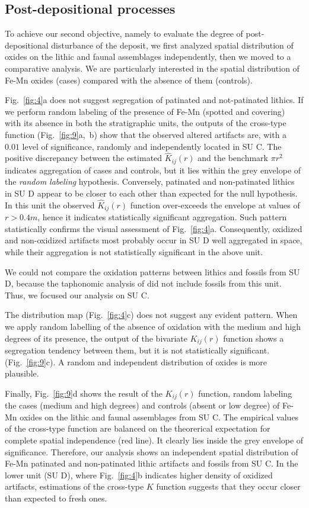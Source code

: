 \documentclass[5p,authoryear]{elsarticle} %
\begin{document}
\subsection{Post-depositional processes}

To achieve our second objective, namely to evaluate the degree of post-depositional disturbance of the deposit, we first analyzed spatial distribution of oxides on the lithic and faunal assemblages independently, then we moved to a comparative analysis. We are particularly interested in the spatial distribution of Fe-Mn oxides (cases) compared with the absence of them (controls).

Fig.~\ref{fig:4}a does not suggest segregation of patinated and not-patinated lithics. If we perform random labeling of the presence of Fe-Mn (spotted and covering) with its absence in both the stratigraphic units, the outputs of the cross-type function (Fig.~\ref{fig:9}a,~b) show that the observed altered artifacts are, with a $0.01$ level of significance, randomly and independently located in SU C. The positive discrepancy between the estimated $\hat K_{ij}(r)$ and the benchmark $\pi r^2$ indicates aggregation of cases and controls, but it lies within the grey envelope of the \emph{random labeling} hypothesis. Conversely, patinated and non-patinated lithics in SU D appear to be closer to each other than expected for the null hypothesis. In this unit the observed $\hat K_{ij}(r)$ function over-exceeds the envelope at values of $r>0.4 m$, hence it indicates statistically significant aggregation. Such pattern statistically confirms the visual assessment of Fig.~\ref{fig:4}a. Consequently, oxidized and non-oxidized artifacts most probably occur in SU D well aggregated in space, while their aggregation is not statistically significant in the above unit.

We could not compare the oxidation patterns between lithics and fossils from SU D, because the taphonomic analysis of \citet{Bagnus2011} did not include fossils from this unit. Thus, we focused our analysis on SU C.

The distribution map (Fig.~\ref{fig:4}c) does not suggest any evident pattern. When we apply random labelling of the absence of oxidation with the medium and high degrees of its presence, the output of the bivariate $K_{ij}(r)$ function shows a segregation tendency between them, but it is not statistically significant. (Fig.~\ref{fig:9}c). A random and independent distribution of oxides is more plausible.

Finally, Fig.~\ref{fig:9}d shows the result of the $K_{ij}(r)$ function, random labeling the cases (medium and high degrees) and controls (absent or low degree) of Fe-Mn oxides on the lithic and faunal assemblages from SU C. The empirical values of the cross-type function are balanced on the theorerical expectation for complete spatial independence (red line). It clearly lies inside the grey envelope of significance. Therefore, our analysis shows an independent spatial distribution of Fe-Mn patinated and non-patinated lithic artifacts and fossils from SU C. In the lower unit (SU D), where Fig.~\ref{fig:4}b indicates higher density of oxidized artifacts, estimations of the cross-type $K$ function suggests that they occur closer than expected to fresh ones.
\end{document}
